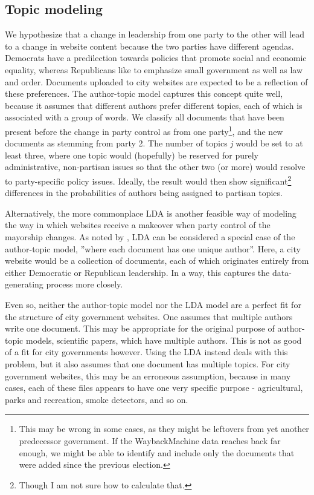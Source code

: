 \documentclass[11pt]{article}
\begin{document}
\subsection{Topic modeling}
We hypothesize that a change in leadership from one party to the other will lead to a change in website content because the two parties have different agendas. Democrats have a predilection towards policies that promote social and economic equality, whereas Republicans like to emphasize small government as well as law and order. Documents uploaded to city websites are expected to be a reflection of these preferences. The author-topic model \citep{Rosen-Zvi2004} captures this concept quite well, because it assumes that different authors prefer different topics, each of which is associated with a group of words. We classify all documents that have been present before the change in party control as from one party\footnote{This may be wrong in some cases, as they might be leftovers from yet another predecessor government. If the WaybackMachine data reaches back far enough, we might be able to identify and include only the documents that were added since the previous election.}, and the new documents as stemming from party 2. The number of topics \textit{j} would be set to at least three, where one topic would (hopefully) be reserved for purely administrative, non-partisan issues so that the other two (or more) would resolve to party-specific policy issues. Ideally, the result would then show significant\footnote{Though I am not sure how to calculate that.} differences in the probabilities of authors being assigned to partisan topics.

Alternatively, the more commonplace LDA is another feasible way of modeling the way in which websites receive a makeover when party control of the mayorship changes. As noted by \citep{Rosen-Zvi2004}, LDA can be considered a special case of the author-topic model, ''where each document has one unique author''. Here, a city website would be a collection of documents, each of which originates entirely from either Democratic or Republican leadership. In a way, this captures the data-generating process more closely.

Even so, neither the author-topic model nor the LDA model are a perfect fit for the structure of city government websites. One assumes that multiple authors write one document. This may be appropriate for the original purpose of author-topic models, scientific papers, which have multiple authors. This is not as good of a fit for city governments however. Using the LDA instead deals with this problem, but it also assumes that one document has multiple topics. For city government websites, this may be an erroneous assumption, because in many cases, each of these files appears to have one very specific purpose - agricultural, parks and recreation, smoke detectors, and so on.
\end{document}
